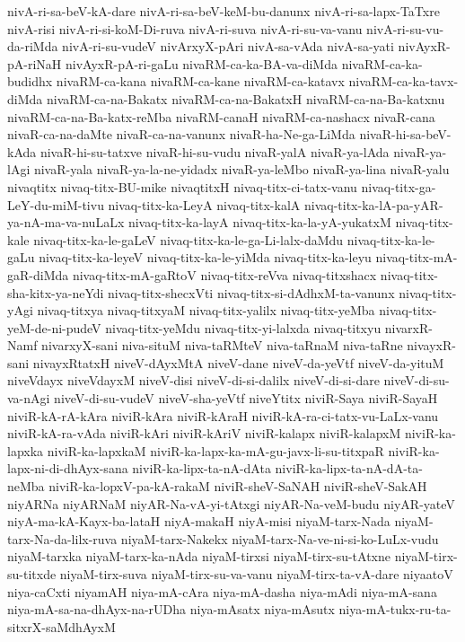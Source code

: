 {nivA-ri-sa-beV-kA-dare
nivA-ri-sa-beV-keM-bu-danunx
nivA-ri-sa-lapx-TaTxre
nivA-risi
nivA-ri-si-koM-Di-ruva
nivA-ri-suva
nivA-ri-su-va-vanu
nivA-ri-su-vu-da-riMda
nivA-ri-su-vudeV
nivArxyX-pAri
nivA-sa-vAda
nivA-sa-yati
nivAyxR-pA-riNaH
nivAyxR-pA-ri-gaLu
nivaRM-ca-ka-BA-va-diMda
nivaRM-ca-ka-budidhx
nivaRM-ca-kana
nivaRM-ca-kane
nivaRM-ca-katavx
nivaRM-ca-ka-tavx-diMda
nivaRM-ca-na-Bakatx
nivaRM-ca-na-BakatxH
nivaRM-ca-na-Ba-katxnu
nivaRM-ca-na-Ba-katx-reMba
nivaRM-canaH
nivaRM-ca-nashacx
nivaR-cana
nivaR-ca-na-daMte
nivaR-ca-na-vanunx
nivaR-ha-Ne-ga-LiMda
nivaR-hi-sa-beV-kAda
nivaR-hi-su-tatxve
nivaR-hi-su-vudu
nivaR-yalA
nivaR-ya-lAda
nivaR-ya-lAgi
nivaR-yala
nivaR-ya-la-ne-yidadx
nivaR-ya-leMbo
nivaR-ya-lina
nivaR-yalu
nivaqtitx
nivaq-titx-BU-mike
nivaqtitxH
nivaq-titx-ci-tatx-vanu
nivaq-titx-ga-LeY-du-miM-tivu
nivaq-titx-ka-LeyA
nivaq-titx-kalA
nivaq-titx-ka-lA-pa-yAR-ya-nA-ma-va-nuLaLx
nivaq-titx-ka-layA
nivaq-titx-ka-la-yA-yukatxM
nivaq-titx-kale
nivaq-titx-ka-le-gaLeV
nivaq-titx-ka-le-ga-Li-lalx-daMdu
nivaq-titx-ka-le-gaLu
nivaq-titx-ka-leyeV
nivaq-titx-ka-le-yiMda
nivaq-titx-ka-leyu
nivaq-titx-mA-gaR-diMda
nivaq-titx-mA-gaRtoV
nivaq-titx-reVva
nivaq-titxshacx
nivaq-titx-sha-kitx-ya-neYdi
nivaq-titx-shecxVti
nivaq-titx-si-dAdhxM-ta-vanunx
nivaq-titx-yAgi
nivaq-titxya
nivaq-titxyaM
nivaq-titx-yalilx
nivaq-titx-yeMba
nivaq-titx-yeM-de-ni-pudeV
nivaq-titx-yeMdu
nivaq-titx-yi-lalxda
nivaq-titxyu
nivarxR-Namf
nivarxyX-sani
niva-situM
niva-taRMteV
niva-taRnaM
niva-taRne
nivayxR-sani
nivayxRtatxH
niveV-dAyxMtA
niveV-dane
niveV-da-yeVtf
niveV-da-yituM
niveVdayx
niveVdayxM
niveV-disi
niveV-di-si-dalilx
niveV-di-si-dare
niveV-di-su-va-nAgi
niveV-di-su-vudeV
niveV-sha-yeVtf
niveYtitx
niviR-Saya
niviR-SayaH
niviR-kA-rA-kAra
niviR-kAra
niviR-kAraH
niviR-kA-ra-ci-tatx-vu-LaLx-vanu
niviR-kA-ra-vAda
niviR-kAri
niviR-kAriV
niviR-kalapx
niviR-kalapxM
niviR-ka-lapxka
niviR-ka-lapxkaM
niviR-ka-lapx-ka-mA-gu-javx-li-su-titxpaR
niviR-ka-lapx-ni-di-dhAyx-sana
niviR-ka-lipx-ta-nA-dAta
niviR-ka-lipx-ta-nA-dA-ta-neMba
niviR-ka-lopxV-pa-kA-rakaM
niviR-sheV-SaNAH
niviR-sheV-SakAH
niyARNa
niyARNaM
niyAR-Na-vA-yi-tAtxgi
niyAR-Na-veM-budu
niyAR-yateV
niyA-ma-kA-Kayx-ba-lataH
niyA-makaH
niyA-misi
niyaM-tarx-Nada
niyaM-tarx-Na-da-lilx-ruva
niyaM-tarx-Nakekx
niyaM-tarx-Na-ve-ni-si-ko-LuLx-vudu
niyaM-tarxka
niyaM-tarx-ka-nAda
niyaM-tirxsi
niyaM-tirx-su-tAtxne
niyaM-tirx-su-titxde
niyaM-tirx-suva
niyaM-tirx-su-va-vanu
niyaM-tirx-ta-vA-dare
niyaatoV
niya-caCxti
niyamAH
niya-mA-cAra
niya-mA-dasha
niya-mAdi
niya-mA-sana
niya-mA-sa-na-dhAyx-na-rUDha
niya-mAsatx
niya-mAsutx
niya-mA-tukx-ru-ta-sitxrX-saMdhAyxM
}
